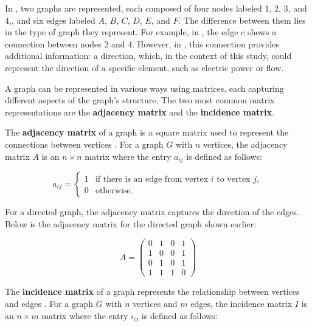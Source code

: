In , two graphs are represented, each composed of four nodes labeled $1$, $2$, $3$, and $4$,, and six edges labeled $A$, $B$, $C$, $D$, $E$, and $F$. The difference between them lies in the type of graph they represent. For example, in , the edge c shows a connection between nodes 2 and 4. However, in , this connection provides additional information: a direction, which, in the context of this study, could represent the direction of a specific element, such as electric power or flow.


A graph can be represented in various ways using matrices, each capturing different aspects of the graph's structure. The two most common matrix representations are the \textbf{adjacency matrix} and the \textbf{incidence matrix}.

The \textbf{adjacency matrix} of a graph is a square matrix used to represent the connections between vertices \cite{wilson_1972}. For a graph $G$ with $n$ vertices, the adjacency matrix $A$ is an $n \times n$ matrix where the entry $a_{ij}$ is defined as follows:

\begin{equation}
 a_{ij} = 
\begin{cases}
1 & \text{if there is an edge from vertex } i \text{ to vertex } j, \\
0 & \text{otherwise}.
\end{cases}
\end{equation}


For a directed graph, the adjacency matrix captures the direction of the edges. Below is the adjacency matrix for the directed graph shown earlier:

\[
A = \begin{pmatrix}
0 & 1 & 0 & 1 \\
1 & 0 & 0 & 1 \\
0 & 1 & 0 & 1 \\
1 & 1 & 1 & 0
\end{pmatrix}
\]


The \textbf{incidence matrix} of a graph represents the relationship between vertices and edges \cite{wilson_1972}. For a graph $G$ with $n$ vertices and $m$ edges, the incidence matrix $I$ is an $n \times m$ matrix where the entry $i_{ij}$ is defined as follows:

